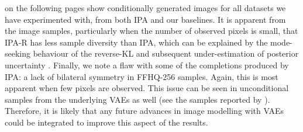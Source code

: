 on the following pages show conditionally generated images for all datasets we have
experimented with, from both IPA and our baselines. It is apparent from the
image samples, particularly when the number of observed pixels is small, that
IPA-R has less sample diversity than IPA, which can be explained by the
mode-seeking behaviour of the reverse-KL and subsequent under-estimation of
posterior uncertainty \citep{minka2005divergence}. Finally, we note a flaw with
some of the completions produced by IPA: a lack of bilateral symmetry in
FFHQ-256 samples. Again, this is most apparent when few pixels are observed.
This issue can be seen in unconditional samples from the underlying VAEs as well
(see the samples reported by \citet{child2020very}). Therefore, it is likely
that any future advances in image modelling with VAEs could be integrated to
improve this aspect of the results.

\newcommand{\qualimgheight}{4cm} 
\newcommand{\qualcaption}[1]{Sampled
  completions from each method for #1 image. Panels (a), (d) and (h) all show
  the true image and the masked image on which the samples in each row are
  conditioned. Panels (b) and (c) show completions from IPA and IPA-R. (g) and
  (k) show the single deterministic completion produced by CE and RFR
  respectively. Each of the remaining panels show five completions for the
  stochastic baselines.} \newcommand{\freeformimgheight}{0.8cm}


